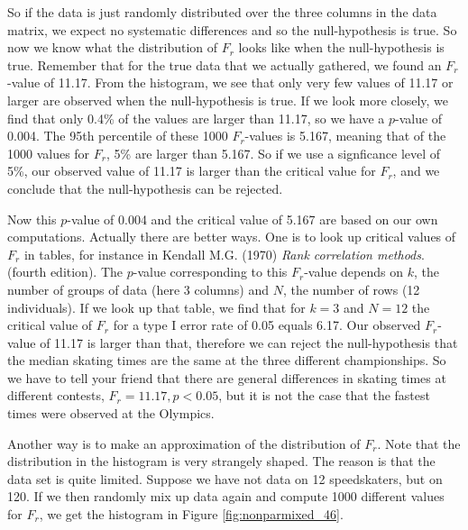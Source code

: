\documentclass[]{book}\usepackage[]{graphicx}\usepackage[]{color}
\begin{document}
So if the data is just randomly distributed over the three columns in the data matrix, we expect no systematic differences and so the null-hypothesis is true. So now we know what the distribution of $F_r$ looks like when the null-hypothesis is true. Remember that for the true data that we actually gathered, we found an $F_r$-value of 11.17. From the histogram, we see that only very few values of 11.17 or larger are observed when the null-hypothesis is true. If we look more closely, we find that only 0.4\% of the values are larger than 11.17, so we have a $p$-value of 0.004. The 95th percentile of these 1000 $F_r$-values is 5.167, meaning that of the 1000 values for $F_r$, 5\% are larger than 5.167. So if we use a signficance level of 5\%, our observed value of 11.17 is larger than the critical value for $F_r$, and we conclude that the null-hypothesis can be rejected.

Now this $p$-value of 0.004 and the critical value of 5.167 are based on our own computations. Actually there are better ways. One is to look up critical values of $F_r$ in tables, for instance in Kendall M.G. (1970) \textit{Rank correlation methods}. (fourth edition). The $p$-value corresponding to this $F_r$-value depends on $k$, the number of groups of data (here 3 columns) and $N$, the number of rows (12 individuals). If we look up that table, we find that for $k=3$ and $N=12$ the critical value of $F_r$ for a type I error rate of 0.05 equals 6.17. Our observed $F_r$-value of 11.17 is larger than that, therefore we can reject the null-hypothesis that the median skating times are the same at the three different championships. So we have to tell your friend that there are general differences in skating times at different contests, $F_r=11.17, p < 0.05$, but it is not the case that the fastest times were observed at the Olympics.

Another way is to make an approximation of the distribution of $F_r$. Note that the distribution in the histogram is very strangely shaped. The reason is that the data set is quite limited. Suppose we have not data on 12 speedskaters, but on 120. If we then randomly mix up data again and compute 1000 different values for $F_r$, we get the histogram in Figure \ref{fig:nonparmixed_46}.
\end{document}
